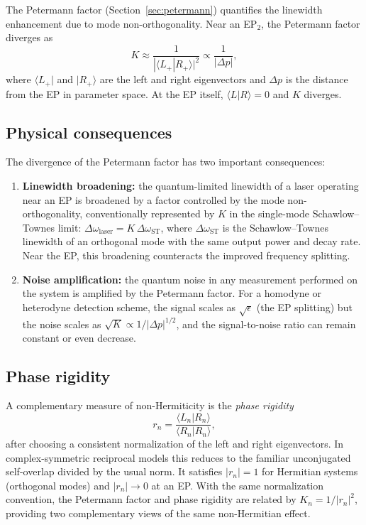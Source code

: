 The Petermann factor (Section~\ref{sec:petermann}) quantifies the
linewidth enhancement due to mode non-orthogonality. Near an EP$_2$,
the Petermann factor diverges as
\begin{equation}
 K \approx \frac{1}{|\langle L_+|R_+\rangle|^2}
 \propto \frac{1}{|\Delta p|},
 \label{eq:petermann-ep}
\end{equation}
where $\langle L_+|$ and $|R_+\rangle$ are the left and right
eigenvectors and $\Delta p$ is the distance from the EP in parameter
space. At the EP itself, $\langle L|R\rangle = 0$ and $K$ diverges.

\subsection{Physical consequences}
\label{ssec:petermann-physics}

The divergence of the Petermann factor has two important consequences:
\begin{enumerate}
 \item \textbf{Linewidth broadening:} the quantum-limited linewidth of
 a laser operating near an EP is broadened by a factor controlled by the
 mode non-orthogonality, conventionally represented by $K$ in the
 single-mode Schawlow--Townes limit:
 $\Delta\omega_{\mathrm{laser}} = K\,\Delta\omega_{\mathrm{ST}}$,
 where $\Delta\omega_{\mathrm{ST}}$ is the Schawlow--Townes
 linewidth of an orthogonal mode with the same output power and decay
 rate. Near the EP, this broadening counteracts the improved frequency
 splitting.
 \item \textbf{Noise amplification:} the quantum noise in any
 measurement performed on the system is amplified by the Petermann
 factor. For a homodyne or heterodyne detection scheme, the signal
 scales as $\sqrt{\epsilon}$ (the EP splitting) but the noise scales
 as $\sqrt{K} \propto 1/|\Delta p|^{1/2}$, and the signal-to-noise
 ratio can remain constant or even decrease.
\end{enumerate}

\subsection{Phase rigidity}
\label{ssec:phase-rigidity}

A complementary measure of non-Hermiticity is the \emph{phase rigidity}
\begin{equation}
 r_n = \frac{\langle L_n|R_n\rangle}{\langle R_n|R_n\rangle},
 \label{eq:phase-rigidity}
\end{equation}
after choosing a consistent normalization of the left and right
eigenvectors. In complex-symmetric reciprocal models this reduces to
the familiar unconjugated self-overlap divided by the usual norm. It
satisfies $|r_n| = 1$ for Hermitian systems (orthogonal modes) and
$|r_n| \to 0$ at an EP. With the same normalization convention, the
Petermann factor and phase rigidity are related by
$K_n = 1/|r_n|^2$, providing two complementary views of the same
non-Hermitian effect.


